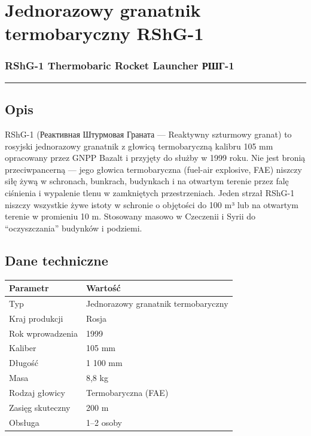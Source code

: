 \documentclass[12pt,openany,oneside]{book}
\begin{document}
\chapter{Jednorazowy granatnik termobaryczny
RShG-1}\label{jednorazowy-granatnik-termobaryczny-rshg-1}

\subsection{RShG-1 Thermobaric Rocket Launcher \textbar{}
РШГ-1}\label{rshg-1-thermobaric-rocket-launcher-ux440ux448ux433-1}

\begin{center}\rule{0.5\linewidth}{0.5pt}\end{center}

\section{Opis}\label{opis-76}

RShG-1 (Реактивная Штурмовая Граната --- Reaktywny szturmowy granat) to
rosyjski jednorazowy granatnik z głowicą termobaryczną kalibru 105 mm
opracowany przez GNPP Bazalt i przyjęty do służby w 1999 roku. Nie jest
bronią przeciwpancerną --- jego głowica termobaryczna (fuel-air
explosive, FAE) niszczy siłę żywą w schronach, bunkrach, budynkach i na
otwartym terenie przez falę ciśnienia i wypalenie tlenu w zamkniętych
przestrzeniach. Jeden strzał RShG-1 niszczy wszystkie żywe istoty w
schronie o objętości do 100 m³ lub na otwartym terenie w promieniu 10 m.
Stosowany masowo w Czeczenii i Syrii do ``oczyszczania'' budynków i
podziemi.

\section{Dane techniczne}\label{dane-techniczne-76}

\begin{longtable}[]{@{}ll@{}}
\toprule\noalign{}
Parametr & Wartość \\
\midrule\noalign{}
\endhead
\bottomrule\noalign{}
\endlastfoot
Typ & Jednorazowy granatnik termobaryczny \\
Kraj produkcji & Rosja \\
Rok wprowadzenia & 1999 \\
Kaliber & 105 mm \\
Długość & 1 100 mm \\
Masa & 8,8 kg \\
Rodzaj głowicy & Termobaryczna (FAE) \\
Zasięg skuteczny & 200 m \\
Obsługa & 1--2 osoby \\
\end{longtable}
\end{document}
